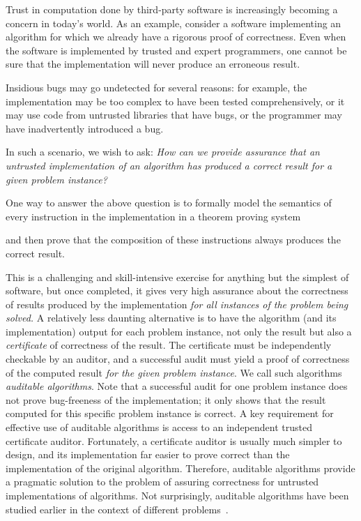 Trust in computation done by third-party software is increasingly
becoming a concern in today's world.  As an example, consider a
software implementing an algorithm for which we already have a
rigorous proof of correctness.  Even when the software is implemented
by trusted and expert programmers, one cannot be sure that the
implementation will never produce an erroneous result.  


Insidious bugs may go undetected for several reasons: for
example, the implementation may be too complex to have been tested
comprehensively, or it may use code from untrusted libraries that have
bugs, or the programmer may have inadvertently introduced a bug.
























In such a scenario, we wish to ask: \emph{How can we provide assurance
that an untrusted implementation of an algorithm has produced a
correct result for a given problem instance?}

One way to answer the above question is to formally model the semantics of
every instruction in the implementation in a theorem proving system

and then prove that the composition of these instructions always
produces the correct result.


This is a challenging and skill-intensive exercise for anything but
the simplest of software, but once completed, it gives very
high assurance about the correctness of results produced by the
implementation \emph{for all instances of the problem being solved.}
A relatively less daunting alternative is to have the algorithm (and
its implementation) output for each problem instance, not only the
result but also a \emph{certificate} of correctness of the result.
The certificate must be independently checkable by an auditor, and a
successful audit must yield a proof of correctness of the computed
result \emph{for the given problem instance}.  We call such
algorithms \emph{auditable algorithms}. Note that a successful audit
for one problem instance does not prove bug-freeness of the
implementation; it only shows that the result computed for this
specific problem instance is correct.  A key requirement for effective
use of auditable algorithms is access to an independent trusted
certificate auditor. Fortunately, a certificate auditor is usually
much simpler to design, and its implementation far easier to prove
correct than the implementation of the original algorithm.  Therefore,
auditable algorithms provide a pragmatic solution to the problem of
assuring correctness for untrusted implementations of algorithms.  Not
surprisingly, auditable algorithms have been studied earlier in the
context of different
problems~\cite{mehlhorn-auditable,Heule13,Wetzler14,Gocht22,Ekici17,Barthe06,Necula98,Magron15,Cheung16}.





